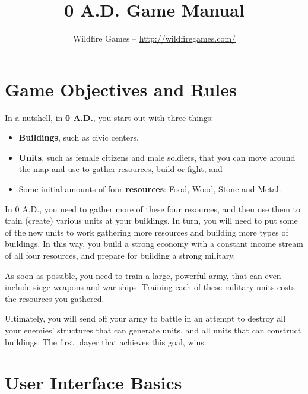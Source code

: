 \documentclass[a4paper,titlepage]{article}
\title{0 A.D. Game Manual}
\author{Wildfire Games -- \url{http://wildfiregames.com/}}
\begin{document}
\maketitle

\tableofcontents
\clearpage

\section{Game Objectives and Rules}

In a nutshell, in \textbf{0 A.D.}, you start out with three things:

\begin{itemize}
\item \textbf{Buildings}, such as civic centers,
\item \textbf{Units}, such as female citizens and male soldiers, that you can move around the map and use to gather resources, build or fight, and
\item Some initial amounts of four \textbf{resources}: Food, Wood, Stone and Metal.
\end{itemize}

In 0 A.D., you need to gather more of these four resources, and then use them to train (create) various units at your buildings. In turn, you will need to put some of the new units to work gathering more resources and building more types of buildings. In this way, you build a strong economy with a constant income stream of all four resources, and prepare for building a strong military.

As soon as possible, you need to train a large, powerful army, that can even include siege weapons and war ships. Training each of these military units costs the resources you gathered.

Ultimately, you will send off your army to battle in an attempt to destroy all your enemies’ structures that can generate units, and all units that can construct buildings. The first player that achieves this goal, wins.

\clearpage

\section{User Interface Basics}
\end{document}
